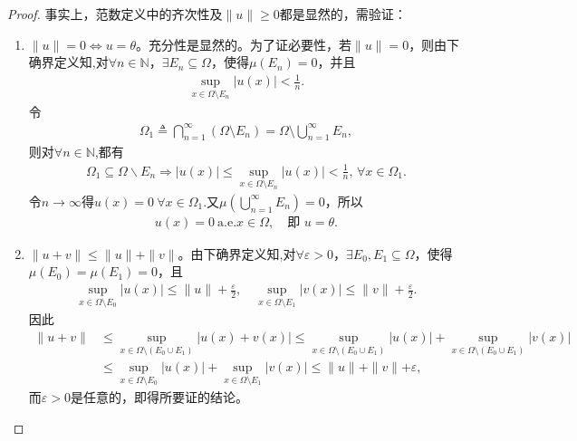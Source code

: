 \documentclass[../../main.tex]{subfiles}%
\begin{document}
\begin{proof}

事实上，范数定义中的齐次性及$\|u\|\geqslant0$都是显然的，需验证：
\begin{enumerate}[(1)]
\item $\|u\|=0\iff u=\theta$。充分性是显然的。为了证必要性，若$\|u\|=0$，则由下确界定义知,对$\forall n\in\mathbb{N}$，$\exists E_n\subseteq\Omega$，使得$\mu(E_n)=0$，并且
\begin{align*}
\sup_{x\in\Omega\setminus E_n}|u(x)|<\frac{1}{n}.
\end{align*}
令
\begin{align*}
\Omega_1\triangleq\bigcap_{n=1}^\infty(\Omega\setminus E_n)=\Omega\setminus\bigcup_{n=1}^\infty E_n,
\end{align*}
则对$\forall n\in\mathbb{N}$,都有
\begin{align*}
\Omega _1\subseteq \Omega \backslash E_n\Longrightarrow |u(x)|\leqslant \mathop {\mathrm{sup}} \limits_{x\in \Omega \setminus E_n}|u(x)|<\frac{1}{n},\,\forall x\in \Omega _1.
\end{align*}
令$n\to \infty$得$u(x)=0\ \forall x\in\Omega_1$.又$\mu\left(\bigcup_{n=1}^\infty E_n\right)=0$，所以
\begin{align*}
u(x)=0\ \text{a.e.}x\in\Omega,\quad\text{即 }u=\theta.
\end{align*}
\item $\|u+v\|\leqslant\|u\|+\|v\|$。由下确界定义知,对$\forall\varepsilon>0$，$\exists E_0,E_1\subseteq\Omega$，使得$\mu(E_0)=\mu(E_1)=0$，且
\begin{align*}
\sup_{x\in\Omega\setminus E_0}|u(x)|\leqslant\|u\|+\frac{\varepsilon}{2},\quad
\sup_{x\in\Omega\setminus E_1}|v(x)|\leqslant\|v\|+\frac{\varepsilon}{2}.
\end{align*}
因此
\begin{align*}
\parallel u+v\parallel &\leqslant \mathop {\mathrm{sup}} \limits_{x\in \Omega \setminus (E_0\cup E_1)}|u(x)+v(x)|\leqslant \mathop {\mathrm{sup}} \limits_{x\in \Omega \setminus (E_0\cup E_1)}|u(x)|+\mathop {\mathrm{sup}} \limits_{x\in \Omega \setminus (E_0\cup E_1)}|v(x)|
\\
&\leqslant \mathop {\mathrm{sup}} \limits_{x\in \Omega \setminus E_0}|u(x)|+\mathop {\mathrm{sup}} \limits_{x\in \Omega \setminus E_1}|v(x)|\leqslant \parallel u\parallel +\parallel v\parallel +\varepsilon ,
\end{align*}
而$\varepsilon>0$是任意的，即得所要证的结论。
\end{enumerate}


\end{proof}
\end{document}
